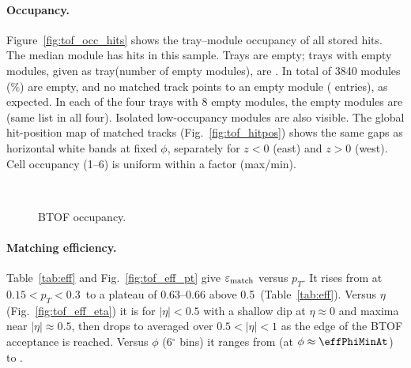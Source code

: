\paragraph{Occupancy.} Figure~\ref{fig:tof_occ_hits} shows the tray--module occupancy of all stored hits.
The median module has \medianModHits{} hits in this sample. Trays \deadTrayList{} are empty;
trays with empty modules, given as tray(number of empty modules), are \partTrayList.
In total \nDeadModule{} of 3840 modules (\fracDeadModule\%) are empty, and no matched track points to an
empty module (\nMatchedInEmpty{} entries), as expected. In each of the four trays with 8 empty modules, the empty modules are \eightModPattern{} (same list in all four). Isolated low-occupancy modules are also visible.
The global hit-position map of matched tracks (Fig.~\ref{fig:tof_hitpos}) shows the same gaps as
horizontal white bands at fixed $\phi$, separately for $z<0$ (east) and $z>0$ (west).
Cell occupancy (1--6) is uniform within a factor \cellMaxOverMin{} (max/min).


\begin{figure}[H]
\centering
{}
\hfill
{}
\\[1ex]
\caption{BTOF occupancy.}
\end{figure}

\paragraph{Matching efficiency.} Table~\ref{tab:eff} and Fig.~\ref{fig:tof_eff_pt} give
$\varepsilon_{\rm match}$ versus $p_T$. It rises from \effLow{} at $0.15<p_T<0.3$\,\GeVc{} to a plateau of
0.63--0.66 above 0.5\,\GeVc{} (Table~\ref{tab:eff}). Versus $\eta$ (Fig.~\ref{fig:tof_eff_eta}) it is \effEtaCentral{} for $|\eta|<0.5$
with a shallow dip at $\eta\approx0$ and maxima near $|\eta|\approx0.5$, then drops to \effEtaOuter{} averaged
over $0.5<|\eta|<1$ as the edge of the BTOF acceptance is reached. Versus $\phi$ (6$^\circ$ bins) it ranges
from \effPhiMin{} (at $\phi\approx\effPhiMinAt$) to \effPhiMax.

